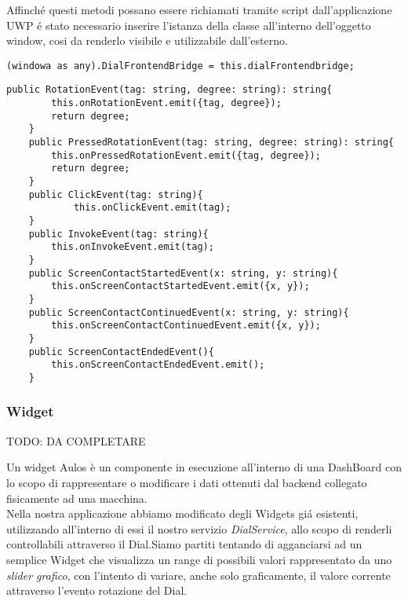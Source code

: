 Affinché questi metodi possano essere richiamati tramite script dall'applicazione UWP é stato necessario inserire l'istanza della classe all'interno dell'oggetto window, cosi da renderlo visibile e utilizzabile dall'esterno.\\

\vspace{1.0cm}
\begin{lstlisting}[caption={Inserimento DialFrontendbridge in window },style=javaScriptCode]
(windowa as any).DialFrontendBridge = this.dialFrontendbridge;
\end{lstlisting} 
\vspace{1.0cm}

\newpage
\vspace{1.0cm}
\begin{lstlisting}[caption={Metodi esposti DialFrontendBridge},style=javaScriptCode]
    public RotationEvent(tag: string, degree: string): string{
        this.onRotationEvent.emit({tag, degree});
        return degree;
    }
    public PressedRotationEvent(tag: string, degree: string): string{
        this.onPressedRotationEvent.emit({tag, degree});
        return degree;
    }
    public ClickEvent(tag: string){
            this.onClickEvent.emit(tag);
    }
    public InvokeEvent(tag: string){
        this.onInvokeEvent.emit(tag);
    }
    public ScreenContactStartedEvent(x: string, y: string){
        this.onScreenContactStartedEvent.emit({x, y});
    }
    public ScreenContactContinuedEvent(x: string, y: string){
        this.onScreenContactContinuedEvent.emit({x, y});
    }
    public ScreenContactEndedEvent(){
        this.onScreenContactEndedEvent.emit();
    }
\end{lstlisting} 

\subsubsection{Widget}

TODO: DA COMPLETARE

Un widget Aulos è un componente in esecuzione all’interno di una DashBoard con lo scopo di rappresentare o modificare i dati ottenuti dal backend collegato fisicamente ad una macchina.\\

Nella nostra applicazione abbiamo modificato degli Widgets giá esistenti, utilizzando all'interno di essi il nostro servizio \emph{DialService}, allo scopo di renderli controllabili attraverso il Dial.Siamo partiti tentando di agganciarsi ad un semplice Widget che visualizza un range di possibili valori rappresentato da uno \emph{slider grafico}, con l'intento di variare, anche solo graficamente, il valore corrente attraverso l'evento rotazione del Dial.\\

